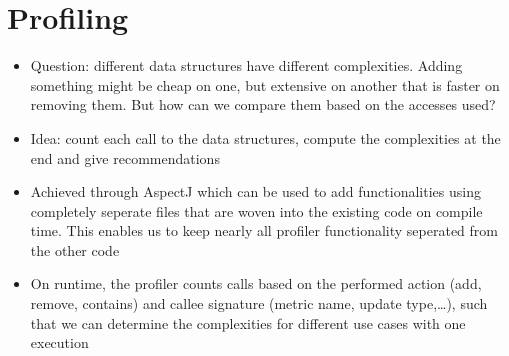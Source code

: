 \section{Profiling}
	\begin{itemize}
		\item Question: different data structures have different complexities. Adding something
			might be cheap on one, but extensive on another that is faster on removing them. But
			how can we compare them based on the accesses used?
		\item Idea: count each call to the data structures, compute the complexities at the
			end and give recommendations
		\item Achieved through AspectJ which can be used to add functionalities using completely
			seperate files that are woven into the existing code on compile time. This enables us
			to keep nearly all profiler functionality seperated from the other code
		\item On runtime, the profiler counts calls based on the performed action (add, remove,
			contains) and callee signature (metric name, update type,\ldots), such that we can
			determine the complexities for different use cases with one execution 
	\end{itemize}
	
